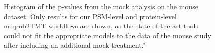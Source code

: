 \documentclass[
  letterpaper,
  DIV=11,
  numbers=noendperiod]{scrartcl}
\begin{document}
\begin{figure}


\caption{\label{fig-mouse-mock-pval}Histogram of the p-values from the
mock analysis on the mouse dataset. Only results for our PSM-level and
protein-level msqrob2TMT workflows are shown, as the state-of-the-art
tools could not fit the appropriate models to the data of the mouse
study after including an additional mock treatment.''}

\end{figure}%
\end{document}
